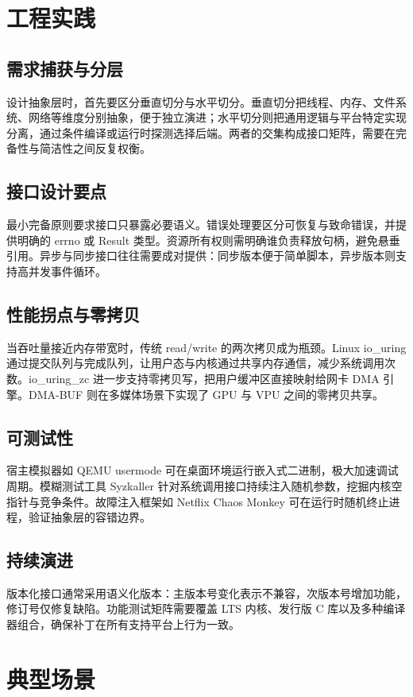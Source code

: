 \chapter{工程实践}
\section{需求捕获与分层}
设计抽象层时，首先要区分垂直切分与水平切分。垂直切分把线程、内存、文件系统、网络等维度分别抽象，便于独立演进；水平切分则把通用逻辑与平台特定实现分离，通过条件编译或运行时探测选择后端。两者的交集构成接口矩阵，需要在完备性与简洁性之间反复权衡。\par
\section{接口设计要点}
最小完备原则要求接口只暴露必要语义。错误处理要区分可恢复与致命错误，并提供明确的 errno 或 Result 类型。资源所有权则需明确谁负责释放句柄，避免悬垂引用。异步与同步接口往往需要成对提供：同步版本便于简单脚本，异步版本则支持高并发事件循环。\par
\section{性能拐点与零拷贝}
当吞吐量接近内存带宽时，传统 read/write 的两次拷贝成为瓶颈。Linux io\_{}uring 通过提交队列与完成队列，让用户态与内核通过共享内存通信，减少系统调用次数。io\_{}uring\_{}zc 进一步支持零拷贝写，把用户缓冲区直接映射给网卡 DMA 引擎。DMA-BUF 则在多媒体场景下实现了 GPU 与 VPU 之间的零拷贝共享。\par
\section{可测试性}
宿主模拟器如 QEMU usermode 可在桌面环境运行嵌入式二进制，极大加速调试周期。模糊测试工具 Syzkaller 针对系统调用接口持续注入随机参数，挖掘内核空指针与竞争条件。故障注入框架如 Netflix Chaos Monkey 可在运行时随机终止进程，验证抽象层的容错边界。\par
\section{持续演进}
版本化接口通常采用语义化版本：主版本号变化表示不兼容，次版本号增加功能，修订号仅修复缺陷。功能测试矩阵需要覆盖 LTS 内核、发行版 C 库以及多种编译器组合，确保补丁在所有支持平台上行为一致。\par
\chapter{典型场景}
